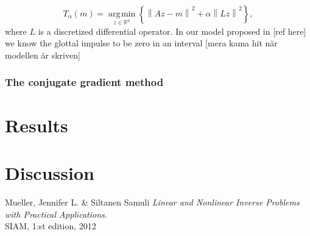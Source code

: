 \documentclass[12pt,a4]{article}
\DeclareMathOperator*{\argmin}{\arg\!\min}
\newcommand{\R}{{\mathbb R}}
\newcommand{\lnorm}{\left\|}
\newcommand{\rnorm}{\right\|}
\begin{document}
\begin{equation}
T_\alpha(m) = \underset{z\in\R^n}{\argmin}
\left\{ \lnorm Az - m \rnorm^2 + \alpha \lnorm Lz \rnorm^2 \right\},
\end{equation}  
where $L$ is a discretized differential operator. In our model proposed in [ref here] we know the glottal impulse to be zero in an interval [mera kama hit när modellen är skriven]


\subsubsection{The conjugate gradient method}\label{subsubsec:conjgrad}

\section{Results}\label{sec:results}


\section{Discussion}\label{sec:discussion}

\newpage
\begin{thebibliography}{9}
	Mueller, Jennifer L. \& Siltanen Samuli \emph{Linear and Nonlinear Inverse Problems with Practical Applications}.\\
	SIAM, 1:st edition, 2012

\end{thebibliography}
\end{document}
